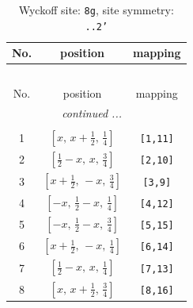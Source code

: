 \documentclass[fleqn,8pt]{jsarticle}
\begin{document}
\begin{longtable}{ccc}
\caption{Wyckoff site: {\tt 8g}, site symmetry: {\tt ..2'}}
 \\
 \hline \hline
No. & position & mapping \\ \hline \endfirsthead

\multicolumn{2}{l}{\tablename\ \thetable{}} \\
 \hline \hline
No. & position & mapping \\ \hline \endhead

 \hline \hline
\multicolumn{2}{r}{\footnotesize\it continued ...} \\ \endfoot

 \hline \hline
\multicolumn{2}{r}{} \\ \endlastfoot

1 & $\left[ x,\, x + \frac{1}{2},\, \frac{1}{4} \right]$ & {\tt [1,11]} \\ \hline
2 & $\left[ \frac{1}{2} - x,\, x,\, \frac{3}{4} \right]$ & {\tt [2,10]} \\ \hline
3 & $\left[ x + \frac{1}{2},\, - x,\, \frac{3}{4} \right]$ & {\tt [3,9]} \\ \hline
4 & $\left[ - x,\, \frac{1}{2} - x,\, \frac{1}{4} \right]$ & {\tt [4,12]} \\ \hline
5 & $\left[ - x,\, \frac{1}{2} - x,\, \frac{3}{4} \right]$ & {\tt [5,15]} \\ \hline
6 & $\left[ x + \frac{1}{2},\, - x,\, \frac{1}{4} \right]$ & {\tt [6,14]} \\ \hline
7 & $\left[ \frac{1}{2} - x,\, x,\, \frac{1}{4} \right]$ & {\tt [7,13]} \\ \hline
8 & $\left[ x,\, x + \frac{1}{2},\, \frac{3}{4} \right]$ & {\tt [8,16]} \\
\end{longtable}
\renewcommand{\arraystretch}{1.2}
\end{document}

